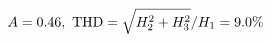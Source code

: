 \documentclass[preview]{standalone}
\begin{document}
\begin{align*}
\special{dvisvgm:raw <g id='unique000'>}A=0.46,\ \text{THD}=\sqrt{H_2^2+H_3^2}/H_1=9.0\%\special{dvisvgm:raw </g>}
\end{align*}
\end{document}
